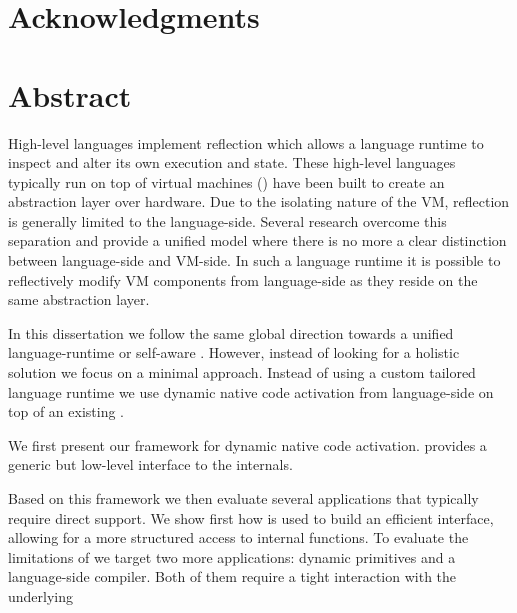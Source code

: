 \documentclass[a4paper,11pt,twoside]{include/ThesisStyle}
\begin{document}


\dominitoc

\cleardoublepage
\chapter*{Acknowledgments}


\cleardoublepage
\chapter*{Abstract}
High-level languages implement reflection which allows a language runtime to inspect and alter its own execution and state.
These high-level languages typically run on top of virtual machines (\VMs) have been built to create an abstraction layer over hardware.
Due to the isolating nature of the VM, reflection is generally limited to the language-side.
Several research \VMs overcome this separation and provide a unified model where there is no more a clear distinction between language-side and VM-side.
In such a language runtime it is possible to reflectively modify VM components from language-side as they reside on the same abstraction layer.

In this dissertation we follow the same global direction towards a unified language-runtime or self-aware \VM.
However, instead of looking for a holistic solution we focus on a minimal approach.
Instead of using a custom tailored language runtime we use dynamic native code activation from language-side on top of an existing \VM.

We first present \B our framework for dynamic native code activation.
\B provides a generic but low-level interface to the \VM internals.

Based on this framework we then evaluate several applications that typically require direct \VM support.
We show first how \B is used to build an efficient \FFI interface, allowing for a more structured access to \VM internal functions.
To evaluate the limitations of \B we target two more applications: dynamic primitives and a language-side \JIT compiler.
Both of them require a tight interaction with the underlying \VM
\end{document}
